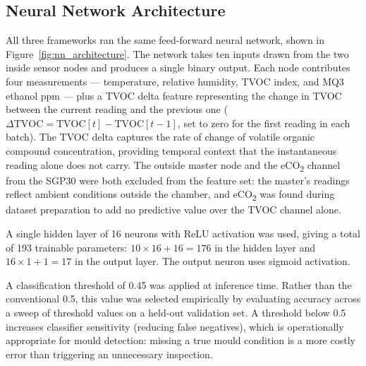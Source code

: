 \subsection{Neural Network Architecture}

All three frameworks ran the same feed-forward neural network, shown in Figure~\ref{fig:nn_architecture}. The network takes ten inputs drawn from the two inside sensor nodes and produces a single binary output. Each node contributes four measurements --- temperature, relative humidity, TVOC index, and MQ3 ethanol ppm --- plus a TVOC delta feature representing the change in TVOC between the current reading and the previous one ($\Delta\text{TVOC} = \text{TVOC}[t] - \text{TVOC}[t-1]$, set to zero for the first reading in each batch). The TVOC delta captures the rate of change of volatile organic compound concentration, providing temporal context that the instantaneous reading alone does not carry. The outside master node and the eCO\textsubscript{2} channel from the SGP30 were both excluded from the feature set: the master's readings reflect ambient conditions outside the chamber, and eCO\textsubscript{2} was found during dataset preparation to add no predictive value over the TVOC channel alone.

A single hidden layer of 16 neurons with ReLU activation was used, giving a total of 193 trainable parameters: $10 \times 16 + 16 = 176$ in the hidden layer and $16 \times 1 + 1 = 17$ in the output layer. The output neuron uses sigmoid activation.

A classification threshold of 0.45 was applied at inference time. Rather than the conventional 0.5, this value was selected empirically by evaluating accuracy across a sweep of threshold values on a held-out validation set. A threshold below 0.5 increases classifier sensitivity (reducing false negatives), which is operationally appropriate for mould detection: missing a true mould condition is a more costly error than triggering an unnecessary inspection.

